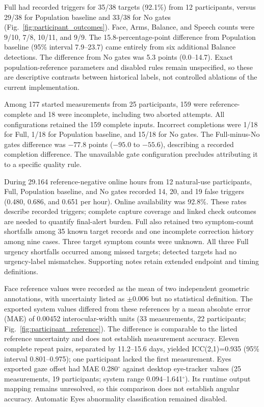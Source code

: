 Full had recorded triggers for 35/38 targets (92.1\%) from 12 participants, versus 29/38 for
Population baseline and 33/38 for No gates (Fig.~\ref{fig:participant_outcomes}).
Face, Arms, Balance, and Speech counts were 9/10, 7/8, 10/11, and 9/9.
The 15.8-percentage-point difference from Population baseline (95\% interval
7.9--23.7) came entirely from six additional Balance detections.
The difference from No gates was 5.3 points (0.0--14.7).
Exact population-reference parameters and disabled rules remain unspecified,
so these are descriptive contrasts between historical labels, not controlled
ablations of the current implementation.

Among 177 started measurements from 25 participants, 159 were reference-complete
and 18 were incomplete, including two aborted attempts. All configurations
retained the 159 complete inputs. Incorrect completions were 1/18 for Full,
1/18 for Population baseline, and 15/18 for No gates. The Full-minus-No gates
difference was $-77.8$ points ($-95.0$ to $-55.6$), describing a recorded completion difference. The unavailable gate configuration
precludes attributing it to a specific quality rule.

During 29.164 reference-negative online hours from 12 natural-use participants,
Full, Population baseline, and No gates recorded 14, 20, and 19 false triggers
(0.480, 0.686, and 0.651 per hour). Online availability was 92.8\%.
These rates describe recorded triggers; complete capture coverage and linked
check outcomes are needed to quantify final-alert burden. Full also retained
two symptom-count shortfalls among 35 known target records and one incomplete
correction history among nine cases. Three target symptom counts were unknown.
All three Full urgency shortfalls occurred among missed targets; detected targets
had no urgency-label mismatches. Supporting notes retain extended endpoint and timing definitions.

Face reference values were recorded as the mean of two independent geometric
annotations, with uncertainty listed as $\pm0.006$ but no statistical definition.
The exported system values differed from these references by a mean absolute error (MAE)
of 0.00452 interocular-width units (33 measurements, 22 participants;
Fig.~\ref{fig:participant_reference}). The difference is comparable to the
listed reference uncertainty and does not establish measurement accuracy.
Eleven complete repeat pairs, separated
by 11.2--15.6 days, yielded ICC(2,1)=0.935 (95\% interval 0.801--0.975);
one participant lacked the first measurement. Eyes exported gaze offset had
MAE 0.280$^\circ$ against desktop eye-tracker values (25 measurements,
19 participants; system range 0.094--1.641$^\circ$). Its runtime output mapping
remains unresolved, so this comparison does not establish angular accuracy.
Automatic Eyes abnormality classification remained disabled.

